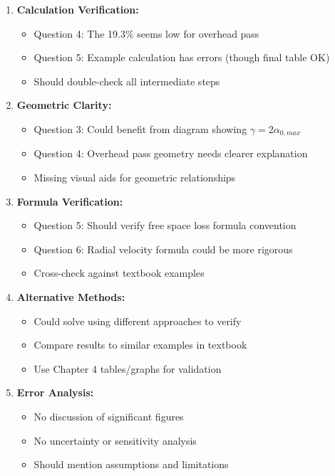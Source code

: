 \documentclass[11pt,letterpaper]{article}
\begin{document}
\begin{enumerate}
    \item \textbf{Calculation Verification:}
    \begin{itemize}
        \item Question 4: The 19.3\% seems low for overhead pass
        \item Question 5: Example calculation has errors (though final table OK)
        \item Should double-check all intermediate steps
    \end{itemize}

    \item \textbf{Geometric Clarity:}
    \begin{itemize}
        \item Question 3: Could benefit from diagram showing $\gamma = 2\alpha_{0,max}$
        \item Question 4: Overhead pass geometry needs clearer explanation
        \item Missing visual aids for geometric relationships
    \end{itemize}

    \item \textbf{Formula Verification:}
    \begin{itemize}
        \item Question 5: Should verify free space loss formula convention
        \item Question 6: Radial velocity formula could be more rigorous
        \item Cross-check against textbook examples
    \end{itemize}

    \item \textbf{Alternative Methods:}
    \begin{itemize}
        \item Could solve using different approaches to verify
        \item Compare results to similar examples in textbook
        \item Use Chapter 4 tables/graphs for validation
    \end{itemize}

    \item \textbf{Error Analysis:}
    \begin{itemize}
        \item No discussion of significant figures
        \item No uncertainty or sensitivity analysis
        \item Should mention assumptions and limitations
    \end{itemize}
\end{enumerate}
\end{document}
